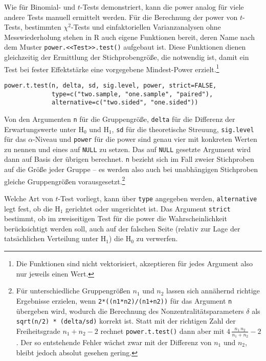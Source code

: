 Wie für Binomial- und $t$-Tests demonstriert, kann die power analog für viele andere Tests manuell ermittelt werden. Für die Berechnung der power von $t$-Tests, bestimmten $\chi^{2}$-Tests und einfaktoriellen Varianzanalysen ohne Messwiederholung stehen in R auch eigene Funktionen bereit, deren Name nach dem Muster \lstinline!power.<<Test>>.test()! aufgebaut ist. Diese Funktionen dienen gleichzeitig der Ermittlung der Stichprobengröße, die notwendig ist, damit ein Test bei fester Effektstärke eine vorgegebene Mindest-Power erzielt.\footnote{Die Funktionen sind nicht vektorisiert, akzeptieren für jedes Argument also nur jeweils einen Wert.}
\begin{lstlisting}
power.t.test(n, delta, sd, sig.level, power, strict=FALSE,
             type=c("two.sample, "one.sample", "paired"),
             alternative=c("two.sided", "one.sided"))
\end{lstlisting}

Von den Argumenten \lstinline!n! für die Gruppengröße, \lstinline!delta! für die Differenz der Erwartungswerte unter $\text{H}_{0}$ und $\text{H}_{1}$, \lstinline!sd! für die theoretische Streuung, \lstinline!sig.level! für das $\alpha$-Niveau und \lstinline!power! für die power sind genau vier mit konkreten Werten zu nennen und eines auf \lstinline!NULL! zu setzen. Das auf \lstinline!NULL! gesetzte Argument wird dann auf Basis der übrigen berechnet. \lstinline!n! bezieht sich im Fall zweier Stichproben auf die Größe jeder Gruppe -- es werden also auch bei unabhängigen Stichproben gleiche Gruppengrößen vorausgesetzt.\footnote{Für unterschiedliche Gruppengrößen $n_{1}$ und $n_{2}$ lassen sich annähernd richtige Ergebnisse erzielen, wenn \lstinline!2*((n1*n2)/(n1+n2))! für das Argument \lstinline!n! übergeben wird, wodurch die Berechnung des Nonzentralitätsparameters $\delta$ als \lstinline!sqrt(n/2) * (delta/sd)! korrekt ist. Statt mit der richtigen Zahl der Freiheitsgrade $n_{1}+n_{2}-2$ rechnet \lstinline!power.t.test()! dann aber mit $4 \, \frac{n_{1} \, n_{2}}{n_{1}+n_{2}} - 2$. Der so entstehende Fehler wächst zwar mit der Differenz von $n_{1}$ und $n_{2}$, bleibt jedoch absolut gesehen gering.}

Welche Art von $t$-Test vorliegt, kann über \lstinline!type! angegeben werden, \lstinline!alternative! legt fest, ob die $\text{H}_{1}$ gerichtet oder ungerichtet ist. Das Argument \lstinline!strict! bestimmt, ob im zweiseitigen Test für die power die Wahrscheinlichkeit berücksichtigt werden soll, auch auf der falschen Seite (relativ zur Lage der tatsächlichen Verteilung unter $\text{H}_{1}$) die $\text{H}_{0}$ zu verwerfen.

